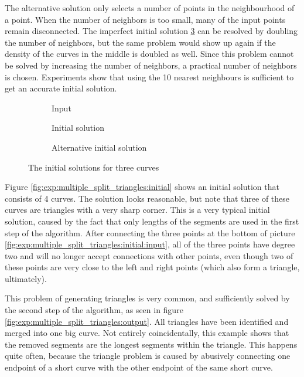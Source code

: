 \documentclass[11pt]{article}
\begin{document}
The alternative solution only selects a number of points in the neighbourhood of a point. When the number of neighbors is too small, many of the input points remain disconnected. The imperfect initial solution \ref{fig:exp:multiple_initial:alternative} can be resolved by doubling the number of neighbors, but the same problem would show up again if the density of the curves in the middle is doubled as well. Since this problem cannot be solved by increasing the number of neighbors, a practical number of neighbors is chosen.
Experiments show that using the 10 nearest neighbours is sufficient to get an accurate initial solution.

\begingroup
{}%
\begin{figure}[ht!]
\centering
\begin{subfigure}{.33\linewidth}
\centering

\caption{Input}
\label{fig:exp:multiple_initial:input}
\end{subfigure}%
\begin{subfigure}{.33\linewidth}
\centering

\caption{Initial solution}
\label{fig:exp:multiple_initial:initial}
\end{subfigure}%
\begin{subfigure}{.33\linewidth}
\centering

\caption{Alternative initial solution}
\label{fig:exp:multiple_initial:alternative}
\end{subfigure}
\caption{The initial solutions for three curves}
\label{fig:exp:multiple_initial}
\end{figure}
\endgroup

Figure \ref{fig:exp:multiple_split_triangles:initial} shows an initial solution that consists of 4 curves. The solution looks reasonable, but note that three of these curves are triangles with a very sharp corner. This is a very typical initial solution, caused by the fact that only lengths of the segments are used in the first step of the algorithm. After connecting the three points at the bottom of picture \ref{fig:exp:multiple_split_triangles:initial:input}, all of the three points have degree two and will no longer accept connections with other points, even though two of these points are very close to the left and right points (which also form a triangle, ultimately).

This problem of generating triangles is very common, and sufficiently solved by the second step of the algorithm, as seen in figure \ref{fig:exp:multiple_split_triangles:output}. All triangles have been identified and merged into one big curve. Not entirely coincidentally, this example shows that the removed segments are the longest segments within the triangle. This happens quite often, because the triangle problem is caused by abusively connecting one endpoint of a short curve with the other endpoint of the same short curve.
\end{document}
